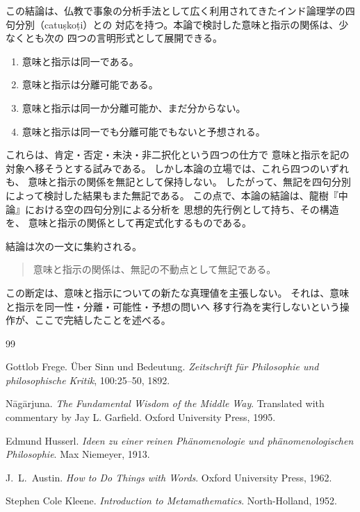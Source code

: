\documentclass[11pt,a4paper,ja=standard,lualatex]{bxjsarticle}
\begin{document}
この結論は、仏教で事象の分析手法として広く利用されてきたインド論理学の四句分別（catu\d{s}ko\d{t}i）との
対応を持つ。本論で検討した意味と指示の関係は、少なくとも次の
四つの言明形式として展開できる。
\begin{enumerate}
\item 意味と指示は同一である。
\item 意味と指示は分離可能である。
\item 意味と指示は同一か分離可能か、まだ分からない。
\item 意味と指示は同一でも分離可能でもないと予想される。
\end{enumerate}
これらは、肯定・否定・未決・非二択化という四つの仕方で
意味と指示を記の対象へ移そうとする試みである。
しかし本論の立場では、これら四つのいずれも、
意味と指示の関係を無記として保持しない。
したがって、無記を四句分別によって検討した結果もまた無記である。
この点で、本論の結論は、龍樹『中論』における空の四句分別による分析を
思想的先行例として持ち、その構造を、
意味と指示の関係として再定式化するものである。

結論は次の一文に集約される。

\begin{quote}
意味と指示の関係は、無記の不動点として無記である。
\end{quote}

この断定は、意味と指示についての新たな真理値を主張しない。
それは、意味と指示を同一性・分離・可能性・予想の問いへ
移す行為を実行しないという操作が、ここで完結したことを述べる。

\begin{thebibliography}{99}

Gottlob Frege.
\newblock \"{U}ber Sinn und Bedeutung.
\newblock \emph{Zeitschrift f\"{u}r Philosophie und philosophische Kritik},
  100:25--50, 1892.

N\=ag\=arjuna.
\newblock \emph{The Fundamental Wisdom of the Middle Way}.
\newblock Translated with commentary by Jay L. Garfield.
\newblock Oxford University Press, 1995.

Edmund Husserl.
\newblock \emph{Ideen zu einer reinen Ph\"{a}nomenologie und
  ph\"{a}nomenologischen Philosophie}.
\newblock Max Niemeyer, 1913.

J.\ L.\ Austin.
\newblock \emph{How to Do Things with Words}.
\newblock Oxford University Press, 1962.

Stephen Cole Kleene.
\newblock \emph{Introduction to Metamathematics}.
\newblock North-Holland, 1952.

\end{thebibliography}
\end{document}
